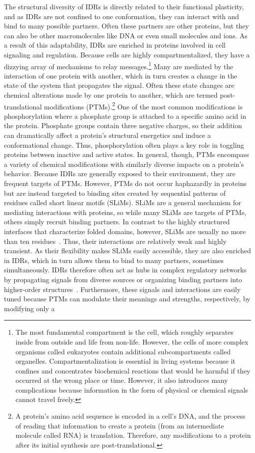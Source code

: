 The structural diversity of IDRs is directly related to their functional plasticity, and as IDRs are not confined to one conformation, they can interact with and bind to many possible partners. Often these partners are other proteins, but they can also be other macromolecules like DNA or even small molecules and ions. As a result of this adaptability, IDRs are enriched in proteins involved in cell signaling and regulation. Because cells are highly compartmentalized, they have a dizzying array of mechanisms to relay messages.\footnote{The most fundamental compartment is the cell, which roughly separates inside from outside and life from non-life. However, the cells of more complex organisms called eukaryotes contain additional subcompartments called organelles. Compartmentalization is essential in living systems because it confines and concentrates biochemical reactions that would be harmful if they occurred at the wrong place or time. However, it also introduces many complications because information in the form of physical or chemical signals cannot travel freely.} Many are mediated by the interaction of one protein with another, which in turn creates a change in the state of the system that propagates the signal. Often these state changes are chemical alterations made by one protein to another, which are termed post-translational modifications (PTMs).\footnote{A protein's amino acid sequence is encoded in a cell's DNA, and the process of reading that information to create a protein (from an intermediate molecule called RNA) is translation. Therefore, any modifications to a protein after its initial synthesis are post-translational.} One of the most common modifications is phosphorylation where a phosphate group is attached to a specific amino acid in the protein. Phosphate groups contain three negative charges, so their addition can dramatically affect a protein's structural energetics and induce a conformational change. Thus, phosphorylation often plays a key role in toggling proteins between inactive and active states. In general, though, PTMs encompass a variety of chemical modifications with similarly diverse impacts on a protein's behavior. Because IDRs are generally exposed to their environment, they are frequent targets of PTMs. However, PTMs do not occur haphazardly in proteins but are instead targeted to binding sites created by sequential patterns of residues called short linear motifs (SLiMs). SLiMs are a general mechanism for mediating interactions with proteins, so while many SLiMs are targets of PTMs, others simply recruit binding partners. In contrast to the highly structured interfaces that characterize folded domains, however, SLiMs are usually no more than ten residues~\cite{Tompa2014}. Thus, their interactions are relatively weak and highly transient. As their flexibility makes SLiMs easily accessible, they are also enriched in IDRs, which in turn allows them to bind to many partners, sometimes simultaneously. IDRs therefore often act as hubs in complex regulatory networks by propagating signals from diverse sources or organizing binding partners into higher-order structures~\cite{Dunker2005, Wright2014}. Furthermore, these signals and interactions are easily tuned because PTMs can modulate their meanings and strengths, respectively, by modifying only a 